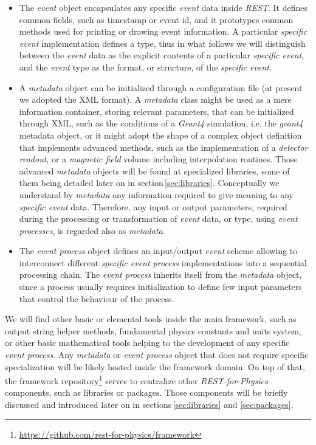
\begin{itemize}
    \item The \emph{event} object encapsulates any specific \emph{event} data inside \emph{REST}. It defines common fields, such as timestamp or event id, and it prototypes common methods used for printing or drawing event information. A particular \emph{specific event} implementation defines a type, thus in what follows we will distinguish between the \emph{event} data as the explicit contents of a particular \emph{specific event}, and the \emph{event} type as the format, or structure, of the \emph{specific event}.
    
    \item A \emph{metadata} object can be initialized through a configuration file (at present we adopted the XML format). A \emph{metadata} class might be used as a mere information container, storing relevant parameters, that can be initialized through XML, such as the conditions of a \emph{Geant4} simulation, i.e. the \emph{geant4} metadata object, or it might adopt the shape of a complex object definition that implements advanced methods, such as the implementation of a \emph{detector readout}, or a \emph{magnetic field} volume including interpolation routines. Those advanced \emph{metadata} objects will be found at specialized libraries, some of them being detailed later on in section\,\ref{sec:libraries}. Conceptually we understand by \emph{metadata} any information required to give meaning to any \emph{specific event} data. Therefore, any input or output parameters, required during the processing or transformation of \emph{event} data, or type, using \emph{event processes}, is regarded also as \emph{metadata}. 
    
    \item The \emph{event process} object defines an input/output \emph{event} scheme allowing to interconnect different \emph{specific event process} implementations into a sequential processing chain. The \emph{event process} inherits itself from the \emph{metadata} object, since a process usually requires initialization to define few input parameters that control the behaviour of the process.
\end{itemize}

We will find other basic or elemental tools inside the main framework, such as output string helper methods, fundamental physics constants and units system, or other basic mathematical tools helping to the development of any specific \emph{event process}. Any \emph{metadata} or \emph{event process} object that does not require specific specialization will be likely hosted inside the framework domain.
 On top of that, the framework repository\footnote{\url{https://github.com/rest-for-physics/framework}} serves to centralize other \emph{REST-for-Physics} components, such as libraries or packages. Those components will be briefly discussed and introduced later on in sections\,\ref{sec:libraries} and \ref{sec:packages}. %

